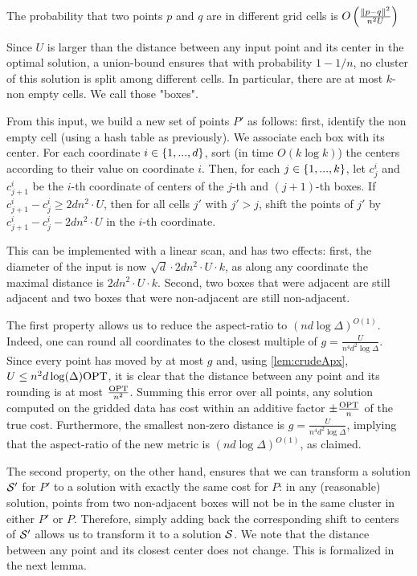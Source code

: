 \begin{lemma}
The probability that two points $p$ and $q$ are in different grid cells is $O\left( \frac{\|p-q\|^2}{n^2 U}\right)$
\end{lemma}

Since $U$ is larger than the distance between any input point and its center in the optimal solution, a union-bound ensures that with probability $1-1/n$, no
cluster of this solution is split among different cells.  In particular, there are at most $k$-non empty cells. We call those "boxes".

From this input, we build a new set of points $P'$ as follows: first, identify the non empty cell (using a hash table as previously). We associate each box with
its center.  For each coordinate $i \in \left\{ 1, ..., d \right\}$, sort (in time $O(k \log k)$) the centers according to their value on coordinate $i$. Then, for
each $j \in \left\{ 1, ..., k\right\}$, let $c^i_j$ and $c^i_{j+1}$ be the $i$-th coordinate of centers of the $j$-th and $(j+1)$-th boxes. If $c^i_{j+1} - c^i_j
\geq 2d n^2\cdot U$, then for all cells $j'$ with $j' > j$, shift the points of $j'$ by $c^i_{j+1} - c^i_j - 2d n^2\cdot U$ in the $i$-th coordinate.

This can be implemented with a linear scan, and has two effects: first, the diameter of the input is now $\sqrt{d} \cdot 2d n^2\cdot U \cdot k$, as along any
coordinate the maximal distance is $2d n^2\cdot U \cdot k$. Second, two boxes that were adjacent are still adjacent and two boxes that were non-adjacent are
still non-adjacent.

The first property allows us to reduce the aspect-ratio to $(nd \log \Delta)^{O(1)}$.  Indeed, one can round all coordinates to the closest multiple of
$g = \frac{U}{n^4 d^{2} \log \Delta}$. Since every point has moved by at most $g$ and, using \cref{lem:crudeApx}, $U
\leq n^2 d \log(\Delta) \text{OPT}$, it is clear that the distance between any point and its rounding is at most $\frac{\text{OPT}}{n^2}$. Summing this error over all points,
any solution computed on the gridded data has cost within an additive factor $\pm \frac{\text{OPT}}{n}$ of the true cost. Furthermore, the smallest
non-zero distance is $g = \frac{U}{n^4 d^{2} \log \Delta}$, implying that the aspect-ratio of the new metric is $(nd \log \Delta)^{O(1)}$,
as claimed.

The second property, on the other hand, ensures that we can transform a solution $\mathcal S'$ for $P'$ to a solution with exactly the same cost for $P$: in any
(reasonable) solution, points from two non-adjacent boxes will not be in the same cluster in either $P'$ or $P$. Therefore, simply adding back the corresponding
shift to centers of $\mathcal S'$ allows us to transform it to a solution $\mathcal S$. We note that the distance between any point and its closest center does not
change. This is formalized in the next lemma.

